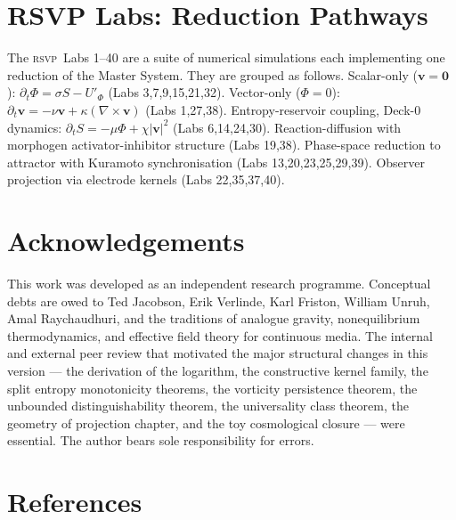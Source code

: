 \documentclass[12pt, oneside]{book}
\theoremstyle{plain}
\theoremstyle{definition}
\newcommand{\vfield}{\mathbf{v}}
\newcommand{\RSVP}{\textsc{rsvp}}
\newcommand{\nab}{\nabla}
\begin{document}
\chapter{RSVP Labs: Reduction Pathways}
\label{app:labs}

The \RSVP\ Labs 1--40 are a suite of numerical simulations each implementing one
reduction of the Master System. They are grouped as follows. Scalar-only
($\vfield=\mathbf{0}$): $\partial_t\Phi = \sigma S - U'_\Phi$ (Labs 3,7,9,15,21,32).
Vector-only ($\Phi=0$): $\partial_t\vfield = -\nu\vfield + \kappa(\nab\times\vfield)$
(Labs 1,27,38). Entropy-reservoir coupling, Deck-0 dynamics:
$\partial_t S = -\mu\Phi + \chi|\vfield|^2$ (Labs 6,14,24,30). Reaction-diffusion
with morphogen activator-inhibitor structure (Labs 19,38). Phase-space reduction
to attractor with Kuramoto synchronisation (Labs 13,20,23,25,29,39). Observer
projection via electrode kernels (Labs 22,35,37,40).

\backmatter

\chapter*{Acknowledgements}

This work was developed as an independent research programme. Conceptual debts are
owed to Ted Jacobson, Erik Verlinde, Karl Friston, William Unruh, Amal Raychaudhuri,
and the traditions of analogue gravity, nonequilibrium thermodynamics, and effective
field theory for continuous media. The internal and external peer review that
motivated the major structural changes in this version --- the derivation of the
logarithm, the constructive kernel family, the split entropy monotonicity theorems,
the vorticity persistence theorem, the unbounded distinguishability theorem, the
universality class theorem, the geometry of projection chapter, and the toy cosmological
closure --- were essential. The author bears sole responsibility for errors.

\chapter*{References}
\end{document}
